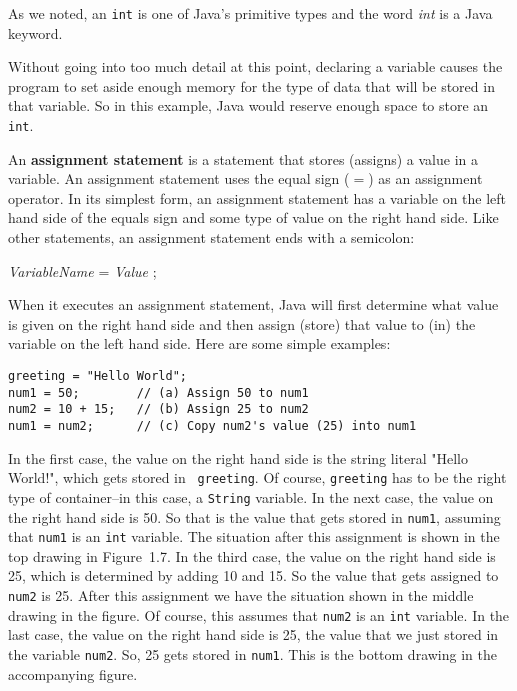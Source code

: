 \noindent As we noted, an {\tt int} is one of Java's primitive types
and the word {\it int} is a Java keyword. 

Without going into too much detail at this point, declaring a
variable causes the program to set aside enough memory for the type of
data that will be stored in that variable. So in this example, Java
would reserve enough space to store an {\tt int}.

An {\bf assignment statement} is a statement that stores (assigns) a
value in a variable.  An assignment statement uses the equal sign ($=$)
as an assignment operator. In its simplest form, an assignment
statement has a variable on the left hand side of the equals sign and
some type of value on the right hand side. Like other statements, an
assignment statement ends with a semicolon:

\begin{extract}
{\it VariableName} = {\it Value} ;
\end{extract}

\noindent When it executes an assignment statement, Java will first
determine what value is given on the right hand side and then
assign (store) that value to (in) the variable on the left hand
side. Here are some simple examples:

\begin{jjjlisting}
\begin{lstlisting}
greeting = "Hello World";
num1 = 50;        // (a) Assign 50 to num1
num2 = 10 + 15;   // (b) Assign 25 to num2
num1 = num2;      // (c) Copy num2's value (25) into num1
\end{lstlisting}
\end{jjjlisting}

\noindent In the first case, the value on the right hand 
side is the string literal "Hello World!", which gets stored in {\tt
greeting}. Of course, {\tt greeting} has to be the right type of
container--in this case, a {\tt String} variable.  In the next case,
the value on the right hand side is 50. So that is the value that gets
stored in {\tt num1}, assuming that {\tt num1} is an {\tt int}
variable. The situation after this assignment is shown in the top
drawing in Figure~1.7.  In the third case, the value on
the right hand side is 25, which is determined by adding 10 and 15. So
the value that gets assigned to {\tt num2} is 25. After this
assignment we have the situation shown in the middle drawing in the
figure. Of course, this assumes that {\tt num2} is an {\tt int}
variable.  In the last case, the value on the right hand side is 25,
the value that we just stored in the variable {\tt num2}. So, 25 gets
stored in {\tt num1}. This is the bottom drawing in the accompanying
figure.

